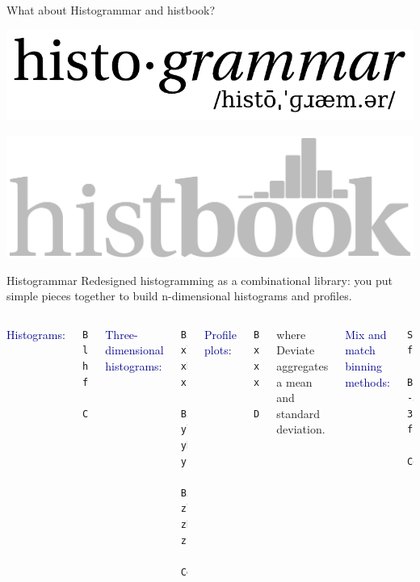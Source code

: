 \documentclass[aspectratio=169]{beamer}
\begin{document}
\begin{frame}{What about Histogrammar and histbook?}
\vspace{0.25 cm}
\begin{center}
\includegraphics[width=0.55\linewidth]{histogrammar-logo-paths.pdf}

\vspace{1 cm}
\includegraphics[width=0.45\linewidth]{histbook-logo.pdf}
\end{center}
\end{frame}

\begin{frame}[fragile]{Histogrammar}
\large
\vspace{0.5 cm}
Redesigned histogramming as a combinational library: you put simple pieces together to build n-dimensional histograms and profiles.

\vspace{1 cm}

\begin{columns}[t]
\small
\textcolor{darkblue}{\normalsize Histograms:}
\begin{verbatim}
Bin(num, low, high, fillRule,
  Count())
\end{verbatim}

\vspace{0.25 cm}
\textcolor{darkblue}{\normalsize Three-dimensional histograms:}
\begin{verbatim}
Bin(xnum, xlow, xhigh, xfill,
  Bin(ynum, ylow, yhigh, yfill,
    Bin(znum, zlow, zhigh, zfill,
      Count()))
\end{verbatim}

\textcolor{darkblue}{\normalsize Profile plots:}
\small
\begin{verbatim}
Bin(xnum, xlow, xhigh, xfill,
  Deviate(yfill))
\end{verbatim}

{\small where {\ttfamily\small Deviate} aggregates a mean and standard deviation.}

\vspace{0.25 cm}
\textcolor{darkblue}{\normalsize Mix and match binning methods:}
\small
\begin{verbatim}
SparselyBin(0.01, filleta,
  Bin(314, -3.14, 3.14, fillphi,
    Count()))
\end{verbatim}
\end{columns}
\end{frame}
\end{document}
